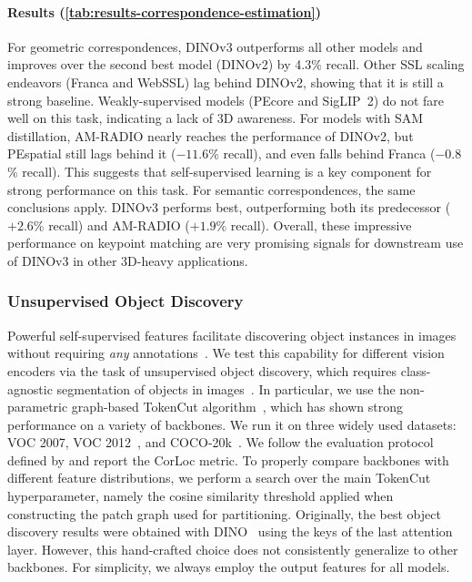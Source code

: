 \paragraph[Results]{Results (\cref{tab:results-correspondence-estimation})}
For geometric correspondences, DINOv3 outperforms all other models and improves over the second best model (DINOv2) by 4.3\% recall.
Other SSL scaling endeavors (Franca and WebSSL) lag behind DINOv2, showing that it is still a strong baseline.
Weakly-supervised models (PEcore and SigLIP~2) do not fare well on this task, indicating a lack of 3D awareness. 
For models with SAM distillation, AM-RADIO nearly reaches the performance of DINOv2, but PEspatial still lags behind it ($-11.6$\% recall), and even falls behind Franca ($-0.8$\% recall).
This suggests that self-supervised learning is a key component for strong performance on this task.
For semantic correspondences, the same conclusions apply.
DINOv3 performs best, outperforming both its predecessor ($+2.6$\% recall) and AM-RADIO ($+1.9$\% recall).
Overall, these impressive performance on keypoint matching are very promising signals for downstream use of DINOv3 in other 3D-heavy applications. 


\subsubsection{Unsupervised Object Discovery}
\label{sec:results-object-discovery}

Powerful self-supervised features facilitate discovering object instances in images without requiring \emph{any} annotations~\citep{Vo21LOD,simeoni2021localizing,seitzer2023bridging,wang2023tokencut,simeoni2025unsupervised}. 
We test this capability for different vision encoders via the task of unsupervised object discovery, which requires class-agnostic segmentation of objects in images~\citep{Russell06ObjectDiscovery,tuytelaars2010bjectDiscovery,Cho2015ObjectDiscovery,Vo2019UnsupOptim}.
In particular, we use the non-parametric graph-based TokenCut algorithm~\citep{wang2023tokencut}, which has shown strong performance on a variety of backbones.
We run it on three widely used datasets: VOC 2007, VOC 2012~\citep{everingham2015pascal}, and COCO-20k~\citep{Lin2014cocodataset,Vo20rOSD}. 
We follow the evaluation protocol defined by \citet{simeoni2021localizing} and report the CorLoc metric. 
To properly compare backbones with different feature distributions, we perform a search over the main TokenCut hyperparameter, namely the cosine similarity threshold applied when constructing the patch graph used for partitioning. 
Originally, the best object discovery results were obtained with DINO~\citep{caron2021emerging} using the keys of the last attention layer.
However, this hand-crafted choice does not consistently generalize to other backbones.
For simplicity, we always employ the output features for all models. 

